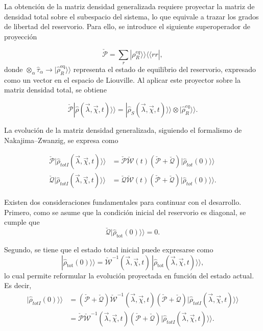 \begin{appendixs}
La obtención de la matriz densidad generalizada requiere proyectar la matriz de densidad total sobre el subespacio del sistema, lo que equivale a trazar los grados de libertad del reservorio. Para ello, se introduce el siguiente superoperador de proyección

\begin{equation*}
    \check{\mathcal{P}} = \sum_{r}|\rho_{R}^{eq} \rangle \rangle \langle \langle rr|,
\end{equation*}
donde \(\otimes_{\alpha} \hat{\tau}_{\alpha} \to |\hat{\rho}_{R}^{\mathrm{eq}} \rangle\rangle\) representa el estado de equilibrio del reservorio, expresado como un vector en el espacio de Liouville. Al aplicar este proyector sobre la matriz densidad total, se obtiene

\begin{equation*}
    \check{\mathcal{P}}|\hat{\rho}(\vec{\lambda},\vec{\chi},t) \rangle \rangle = |\hat{\rho}_{S}(\vec{\lambda},\vec{\chi},t)\rangle \rangle \otimes |\hat{\rho}^{eq}_{R}\rangle \rangle .
\end{equation*}

La evolución de la matriz densidad generalizada, siguiendo el formalismo de Nakajima–Zwanzig, se expresa como

\begin{align}
    \check{\mathcal{P}}|\hat{\rho}_{totI}(\vec{\lambda},\vec{\chi},t)\rangle \rangle & =  \check{\mathcal{P}} \check{\mathcal{W}}(t)( \check{\mathcal{P}} +  \check{\mathcal{Q}})|\hat{\rho}_{tot}(0)\rangle \rangle  \label{apendix2proyectionev1} \\
    \check{\mathcal{Q}}|\hat{\rho}_{totI}(\vec{\lambda},\vec{\chi},t)\rangle \rangle & = \check{\mathcal{Q}} \check{\mathcal{W}}(t)( \check{\mathcal{P}} +  \check{\mathcal{Q}})|\hat{\rho}_{tot}(0)\rangle \rangle. 
\label{apendix2proyectionev}
\end{align}

Existen dos consideraciones fundamentales para continuar con el desarrollo. Primero, como se asume que la condición inicial del reservorio es diagonal, se cumple que
\[
\check{\mathcal{Q}}|\hat{\rho}_{\mathrm{tot}}(0)\rangle\rangle = 0.
\]

Segundo, se tiene que el estado total inicial puede expresarse como
\[
|\hat{\rho}_{\mathrm{tot}}(0)\rangle\rangle = \check{\mathcal{W}}^{-1}(\vec{\lambda}, \vec{\chi}, t)\, |\hat{\rho}_{\mathrm{tot}}(\vec{\lambda}, \vec{\chi}, t)\rangle\rangle,
\]
lo cual permite reformular la evolución proyectada en función del estado actual. Es decir, 
\begin{align*}
    |\hat{\rho}_{totI}(0)\rangle \rangle & = (\check{\mathcal{P}} + \check{\mathcal{Q}} )\check{\mathcal{W}}^{-1}(\vec{\lambda},\vec{\chi},t)(\check{\mathcal{P}} + \check{\mathcal{Q}})|\hat{\rho}_{totI}(\vec{\lambda},\vec{\chi},t)\rangle \rangle \\
        & = \check{\mathcal{P}}\check{\mathcal{W}}^{-1}(\vec{\lambda},\vec{\chi},t)(\check{\mathcal{P}} + \check{\mathcal{Q}})|\hat{\rho}_{totI}(\vec{\lambda},\vec{\chi},t)\rangle \rangle.
\end{align*}


\end{appendixs}
